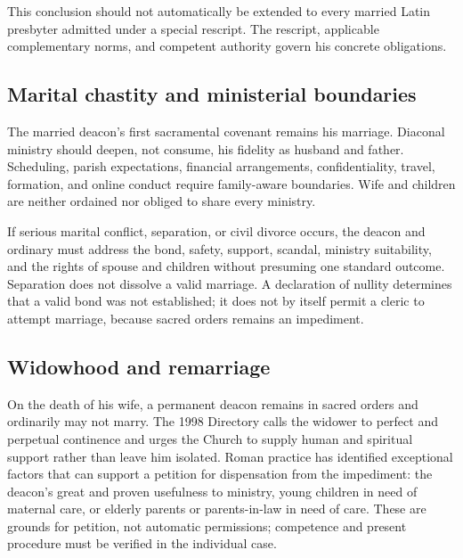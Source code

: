 This conclusion should not automatically be extended to every married Latin presbyter admitted under a special rescript. The rescript, applicable complementary norms, and competent authority govern his concrete obligations.

\subsection{Marital chastity and ministerial boundaries}

The married deacon's first sacramental covenant remains his marriage. Diaconal ministry should deepen, not consume, his fidelity as husband and father. Scheduling, parish expectations, financial arrangements, confidentiality, travel, formation, and online conduct require family-aware boundaries. Wife and children are neither ordained nor obliged to share every ministry.

If serious marital conflict, separation, or civil divorce occurs, the deacon and ordinary must address the bond, safety, support, scandal, ministry suitability, and the rights of spouse and children without presuming one standard outcome. Separation does not dissolve a valid marriage. A declaration of nullity determines that a valid bond was not established; it does not by itself permit a cleric to attempt marriage, because sacred orders remains an impediment.

\subsection{Widowhood and remarriage}

On the death of his wife, a permanent deacon remains in sacred orders and ordinarily may not marry. The 1998 Directory calls the widower to perfect and perpetual continence and urges the Church to supply human and spiritual support rather than leave him isolated. Roman practice has identified exceptional factors that can support a petition for dispensation from the impediment: the deacon's great and proven usefulness to ministry, young children in need of maternal care, or elderly parents or parents-in-law in need of care. These are grounds for petition, not automatic permissions; competence and present procedure must be verified in the individual case.

